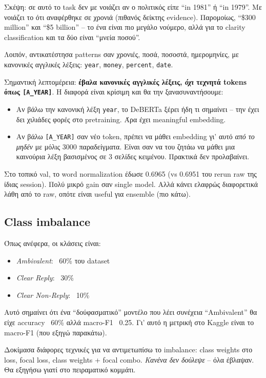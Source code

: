 \documentclass[12pt]{fphw}
\begin{document}
Σκέψη: σε αυτό το task δεν με νοιάζει αν ο πολιτικός είπε ``in 1981'' ή ``in 1979''. Με νοιάζει το ότι αναφέρθηκε σε χρονιά (πιθανός δείκτης evidence). Παρομοίως, ``\$300 million'' και ``\$5 billion'' -- το ένα είναι πιο μεγάλο νούμερο, αλλά για το clarity classification και τα δύο είναι ``μνεία ποσού''.

Λοιπόν, αντικατέστησα patterns σαν χρονιές, ποσά, ποσοστά, ημερομηνίες, με κανονικές αγγλικές λέξεις: \texttt{year}, \texttt{money}, \texttt{percent}, \texttt{date}.

Σημαντική λεπτομέρεια: \textbf{έβαλα κανονικές αγγλικές λέξεις, \emph{όχι} τεχνητά tokens όπως \texttt{[A\_YEAR]}}. Η διαφορά είναι κρίσιμη και θα την ξανασυναντήσουμε:

\begin{itemize}
    \item Αν βάλω την κανονική λέξη \texttt{year}, το DeBERTa ξέρει ήδη τι σημαίνει -- την έχει δει χιλιάδες φορές στο pretraining. Άρα έχει meaningful embedding.
    \item Αν βάλω \texttt{[A\_YEAR]} σαν νέο token, πρέπει να μάθει embedding γι' αυτό \emph{από το μηδέν} με μόλις 3000 παραδείγματα. Είναι σαν να του ζητάω να μάθει μια καινούρια λέξη βασισμένος σε 3 σελίδες κειμένου. Πρακτικά δεν προλαβαίνει.
\end{itemize}

Στο τοπικό val, το word normalization έδωσε 0.6965 (vs 0.6951 του rerun raw της ίδιας session). Πολύ μικρό gain σαν single model. Αλλά κάνει ελαφρώς διαφορετικά λάθη από το raw, οπότε είναι useful για ensemble (πιο κάτω).

\subsection{Class imbalance}

Όπως ανέφερα, οι κλάσεις είναι:

\begin{itemize}
    \item \emph{Ambivalent}: ~60\% του dataset
    \item \emph{Clear Reply}: ~30\%
    \item \emph{Clear Non-Reply}: ~10\%
\end{itemize}

Αυτό σημαίνει ότι ένα ``δούφασματικό'' μοντέλο που λέει συνέχεια ``Ambivalent'' θα είχε accuracy ~60\% αλλά macro-F1 ~0.25. Γι' αυτό η μετρική στο Kaggle είναι το macro-F1 (που εξηγώ παρακάτω).

Δοκίμασα διάφορες τεχνικές για να αντιμετωπίσω το imbalance: class weights στο loss, focal loss, class weights + focal combo. \emph{Κανένα δεν δούλεψε} -- όλα έβλαψαν. Θα εξηγήσω γιατί στο πειραματικό κομμάτι.
\end{document}
